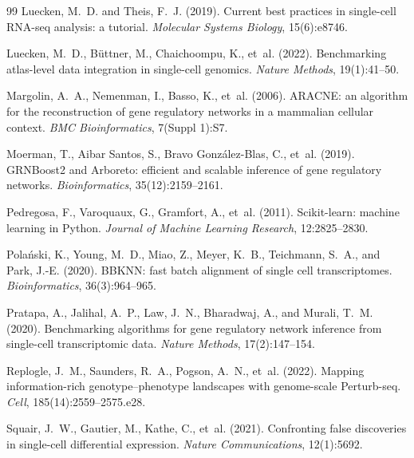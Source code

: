 \documentclass[12pt]{article}
\begin{document}
\begin{thebibliography}{99}
Luecken, M.~D. and Theis, F.~J. (2019).
\newblock Current best practices in single-cell RNA-seq analysis: a tutorial.
\newblock \textit{Molecular Systems Biology}, 15(6):e8746.

Luecken, M.~D., B{\"u}ttner, M., Chaichoompu, K., et~al. (2022).
\newblock Benchmarking atlas-level data integration in single-cell genomics.
\newblock \textit{Nature Methods}, 19(1):41--50.

Margolin, A.~A., Nemenman, I., Basso, K., et~al. (2006).
\newblock ARACNE: an algorithm for the reconstruction of gene regulatory
  networks in a mammalian cellular context.
\newblock \textit{BMC Bioinformatics}, 7(Suppl 1):S7.

Moerman, T., Aibar Santos, S., Bravo Gonz{\'a}lez-Blas, C., et~al. (2019).
\newblock GRNBoost2 and Arboreto: efficient and scalable inference of gene
  regulatory networks.
\newblock \textit{Bioinformatics}, 35(12):2159--2161.

Pedregosa, F., Varoquaux, G., Gramfort, A., et~al. (2011).
\newblock Scikit-learn: machine learning in Python.
\newblock \textit{Journal of Machine Learning Research}, 12:2825--2830.

Pola{\'n}ski, K., Young, M.~D., Miao, Z., Meyer, K.~B., Teichmann, S.~A., and
  Park, J.-E. (2020).
\newblock BBKNN: fast batch alignment of single cell transcriptomes.
\newblock \textit{Bioinformatics}, 36(3):964--965.

Pratapa, A., Jalihal, A.~P., Law, J.~N., Bharadwaj, A., and Murali, T.~M.
  (2020).
\newblock Benchmarking algorithms for gene regulatory network inference from
  single-cell transcriptomic data.
\newblock \textit{Nature Methods}, 17(2):147--154.

Replogle, J.~M., Saunders, R.~A., Pogson, A.~N., et~al. (2022).
\newblock Mapping information-rich genotype--phenotype landscapes with
  genome-scale Perturb-seq.
\newblock \textit{Cell}, 185(14):2559--2575.e28.

Squair, J.~W., Gautier, M., Kathe, C., et~al. (2021).
\newblock Confronting false discoveries in single-cell differential expression.
\newblock \textit{Nature Communications}, 12(1):5692.


\end{thebibliography}
\end{document}
